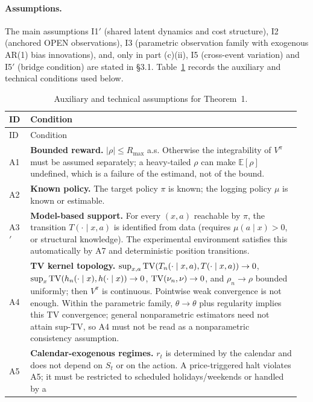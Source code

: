 \paragraph{Assumptions.}
The main assumptions I1$'$ (shared latent dynamics and cost structure), I2
(anchored OPEN observations), I3 (parametric observation family with exogenous
AR(1) bias innovations), and, only in part (c)(ii), I5 (cross-event variation)
and I5$'$ (bridge condition) are stated in \S3.1.  Table~\ref{tab:a1-assumptions}
records the auxiliary and technical conditions used below.

\begin{longtable}{@{}>{\raggedright\arraybackslash}p{0.07\linewidth}>{\raggedright\arraybackslash}p{0.89\linewidth}@{}}
\caption{Auxiliary and technical assumptions for Theorem~1.}\label{tab:a1-assumptions}\\
\hline
ID & Condition \\
\hline
\endfirsthead
\hline
ID & Condition \\
\hline
\endhead
\hline
\endfoot
A1 & \textbf{Bounded reward.} $|\rho|\le R_{\max}$ a.s.  Otherwise the
integrability of $V^\pi$ must be assumed separately; a heavy-tailed $\rho$ can
make $\mathbb E[\rho]$ undefined, which is a failure of the estimand, not of the
bound. \\
A2 & \textbf{Known policy.} The target policy $\pi$ is known; the logging policy
$\mu$ is known or estimable. \\
A3$'$ & \textbf{Model-based support.} For every $(x,a)$ reachable by $\pi$, the
transition $T(\cdot\mid x,a)$ is identified from data (requires
$\mu(a\mid x)>0$, or structural knowledge).  The experimental environment
satisfies this automatically by A7 and deterministic position transitions. \\
A4 & \textbf{TV kernel topology.} $\sup_{x,a}\mathrm{TV}(T_n(\cdot\mid x,a),
T(\cdot\mid x,a))\to0$, $\sup_x\mathrm{TV}(h_n(\cdot\mid x),h(\cdot\mid x))\to0$,
$\mathrm{TV}(\nu_n,\nu)\to0$, and $\rho_n\to\rho$ bounded uniformly; then $V^\pi$ is
continuous.  Pointwise weak convergence is not enough.  Within the parametric
family, $\hat\theta\to\theta$ plus regularity implies this TV convergence;
general nonparametric estimators need not attain sup-TV, so A4 must not be read
as a nonparametric consistency assumption. \\
A5 & \textbf{Calendar-exogenous regimes.} $r_t$ is determined by the calendar
and does not depend on $S_t$ or on the action.  A price-triggered halt violates
A5; it must be restricted to scheduled holidays/weekends or handled by a

\end{longtable}
